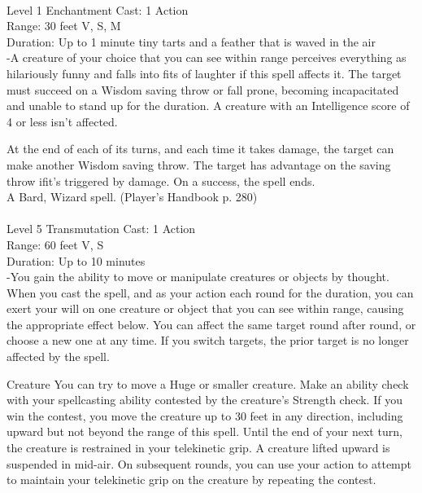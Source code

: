\documentclass[10pt,twocolumn]{report}
\begin{document}
 \\
Level 1 \quad Enchantment \quad Cast: 1 Action\\
Range: 30 feet \quad V, S, M\\
Duration: Up to 1 minute \quad tiny tarts and a feather that is waved in the air\\
-A creature of your choice that you can see within range perceives everything as hilariously funny and falls into fits of laughter if this spell affects it. The target must succeed on a Wisdom saving throw or fall prone, becoming incapacitated and unable to stand up for the duration. A creature with an Intelligence score of 4 or less isn’t affected.

At the end of each of its turns, and each time it takes damage, the target can make another Wisdom saving throw. The target has advantage on the saving throw ifit’s triggered by damage. On a success, the spell ends.\\
A Bard, Wizard spell. (Player's Handbook p. 280) \\


 \\
Level 5 \quad Transmutation \quad Cast: 1 Action\\
Range: 60 feet \quad V, S\\
Duration: Up to 10 minutes \quad \\
-You gain the ability to move or manipulate creatures or objects by thought.
When you cast the spell, and as your action each round for the duration, you can exert your will on one creature or object that you can see within range, causing the appropriate effect below. You can affect the same target round after round, or choose a new one at any time. If you switch targets, the prior target is no longer affected by the spell.

Creature
You can try to move a Huge or smaller creature. Make an ability check with your spellcasting ability contested by the creature’s Strength check. If you win the contest, you move the creature up to 30 feet in any direction, including upward but not beyond the range of this spell. Until the end of your next turn, the creature is restrained in your telekinetic grip. A creature lifted upward is suspended in mid-air.
On subsequent rounds, you can use your action to attempt to maintain your telekinetic grip on the creature by repeating the contest.
\end{document}
